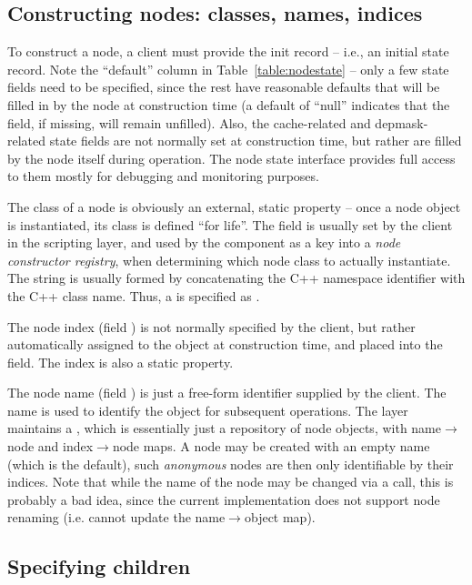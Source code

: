 \subsection{Constructing nodes: classes, names, indices}

  To construct a node, a client must provide the init record -- i.e., an
  initial state record. Note the ``default'' column in
  Table~\ref{table:nodestate} -- only a few state fields need to be specified,
  since the rest have reasonable defaults that will be filled in by the node at
  construction time (a default of ``null'' indicates that the field, if
  missing, will remain unfilled). Also, the cache-related and depmask-related
  state fields are not normally set at construction time, but rather are filled
  by the node itself during operation. The node state interface provides full
  access to them mostly for debugging and monitoring purposes.

  The class of a node is obviously an external, static property -- once a node
  object is instantiated, its class is defined ``for life''. The 
  field is usually set by the client in the scripting layer, and used by the
   component as a key into a {\em node constructor registry},
  when determining which node class to actually instantiate. The 
  string is usually formed by concatenating the C++ namespace identifier with
  the C++ class name. Thus, a  is specified as .
 
  The node index (field ) is not normally specified by the client, but
  rather automatically assigned to the object at construction time, and placed
  into the  field. The index is also a static property.

  The node name (field ) is just a free-form identifier supplied by
  the client. The name is used to identify the object for subsequent
  operations. The  layer maintains a , which is
  essentially just a repository of node objects, with name$\rightarrow$node
  and  index$\rightarrow$node maps. A node may be created with an empty name
  (which is the default), such {\em anonymous} nodes are then only identifiable
  by their indices. Note that while the name of the node may be changed via a
   call, this is probably a bad idea, since the current
   implementation does not support node renaming (i.e. cannot update
  the name$\rightarrow$object map).

\subsection{Specifying children} 
  \label{sec:children}
  
